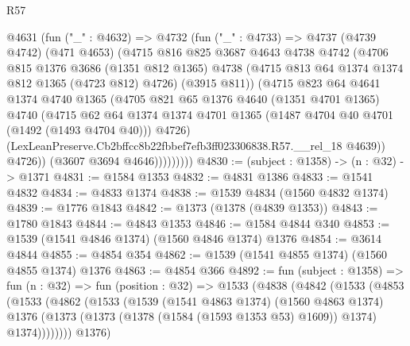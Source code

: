 \begin{lexlean}{R57}
\begin{coremodule}
              @4631
                (fun ("_" : @4632) =>
                @4732
                  (fun ("_" : @4733) =>
                  @4737
                    (@4739 @4742)
                    (@471 @4653)
                    (@4715
                      @816
                      @825
                      @3687
                      @4643
                      @4738
                      @4742
                      (@4706
                        @815
                        @1376
                        @3686
                        (@1351 @812 @1365)
                        @4738
                        (@4715 @813 @64 @1374 @1374 @812 @1365 (@4723 @812) @4726)
                        (@3915 @811))
                      (@4715
                        @823
                        @64
                        @4641
                        @1374
                        @4740
                        @1365
                        (@4705
                          @821
                          @65
                          @1376
                          @4640
                          (@1351 @4701 @1365)
                          @4740
                          (@4715
                            @62
                            @64
                            @1374
                            @1374
                            @4701
                            @1365
                            (@1487 @4704 @40 @4701 (@1492 (@1493 @4704 @40)))
                            @4726)
                          (LexLeanPreserve.Cb2bffcc8b22fbbef7efb3ff023306838.R57.__rel_18 @4639))
                        @4726))
                    (@3607 @3694 @4646)))))))))
@4830 := (subject : @1358) -> (n : @32) -> @1371
@4831 := @1584 @1353
@4832 := @4831 @1386
@4833 := @1541 @4832
@4834 := @4833 @1374
@4838 := @1539 @4834 (@1560 @4832 @1374)
@4839 := @1776 @1843
@4842 := @1373 (@1378 (@4839 @1353))
@4843 := @1780 @1843
@4844 := @4843 @1353
@4846 := @1584 @4844 @340
@4853 := @1539 (@1541 @4846 @1374) (@1560 @4846 @1374) @1376
@4854 := @3614 @4844
@4855 := @4854 @354
@4862 := @1539 (@1541 @4855 @1374) (@1560 @4855 @1374) @1376
@4863 := @4854 @366
@4892 := fun (subject : @1358) =>
  fun (n : @32) =>
  fun (position : @32) =>
  @1533
    (@4838
      (@4842
        (@1533
          (@4853
            (@1533
              (@4862
                (@1533
                  (@1539
                    (@1541 @4863 @1374)
                    (@1560 @4863 @1374)
                    @1376
                    (@1373 (@1373 (@1378 (@1584 (@1593 @1353 @53) @1609)) @1374) @1374))))))))
      @1376)

\end{coremodule}
\end{lexlean}

